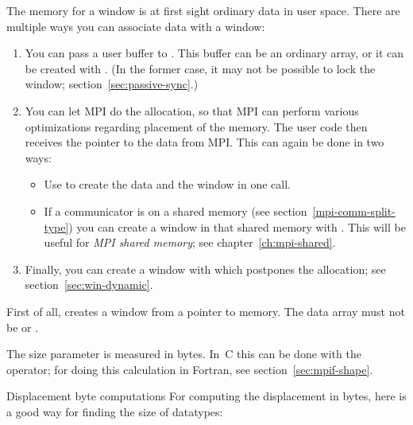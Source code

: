 The memory for a window is at first sight ordinary data in user space. There are multiple
ways you can associate data with a window:
\begin{enumerate}
\item You can pass a user buffer to
  . This buffer can be an ordinary array,
  or it can be created with .
  (In the former case, it may not be possible to lock the window;
  section~\ref{sec:passive-sync}.)
\item You can let MPI do the allocation, so that MPI can perform various
  optimizations regarding placement of the memory. The user code then
  receives the pointer to the data from MPI. This can again be done in two ways:
  \begin{itemize}
  \item Use  to create the data and the
    window in one call.
  \item If a communicator is on a shared memory (see
    section~\ref{mpi-comm-split-type}) you can create a window in that
    shared memory with .
    This will be useful for
    \emph{MPI shared memory};
    see chapter~\ref{ch:mpi-shared}.
  \end{itemize}
\item Finally, you can create a window with
   which postpones the allocation;
  see section~\ref{sec:win-dynamic}.
\end{enumerate}

First of all, 
creates a window from a pointer to memory.
The data array must not be  or .

The size parameter is measured in bytes. In~C this can be done
with the  operator;
%
%
for doing this calculation in Fortran, see section~\ref{sec:mpif-shape}.

\begin{pythonnote}{Displacement byte computations}
  For computing the displacement in bytes,
  here is a good way for finding the size of  datatypes:
\end{pythonnote}


